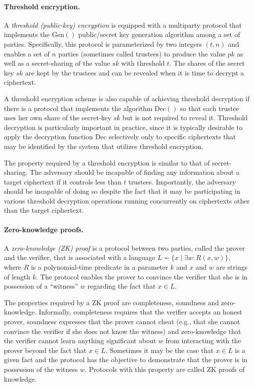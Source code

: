 \paragraph{Threshold encryption.} A \emph{threshold (public-key)
  encryption} is equipped with a multiparty protocol that implements
the $\mathrm{Gen}()$ public/secret key generation algorithm among a
set of parties. Specifically, this protocol is parameterized by two
integers $(t,n)$ and enables a set of $n$ parties (sometimes called
trustees) to produce the value $pk$ as well as a secret-sharing of the
value $sk$ with threshold $t$. The shares of the secret key $sk$ are
kept by the trustees and can be revealed when it is time to decrypt a
ciphertext.

A threshold encryption scheme is also capable of achieving threshold
decryption if there is a protocol that implements the algorithm
$\mathrm{Dec}()$ so that each trustee uses her own share of the
secret-key $sk$ but is not required to reveal it. Threshold decryption
is particularly important in practice, since it is typically desirable
to apply the decryption function $\mathrm{Dec}$ selectively only to
specific ciphertexts that may be identified by the system that
utilizes threshold encryption.

The property required by a threshold encryption is similar to that of
secret-sharing. The adversary should be incapable of finding any
information about a target ciphertext if it controls less than $t$
trustees. Importantly, the adversary should be incapable of doing so
despite the fact that it may be participating in various threshold
decryption operations running concurrently on ciphertexts other than
the target ciphertext.

\paragraph{Zero-knowledge proofs.} A \emph{zero-knowledge (ZK) proof}
is a protocol between two parties, called the prover and the verifier,
that is associated with a language
$L = \{x \mid \exists w : R(x,w)\}$, where $R$ is a polynomial-time
predicate in a parameter $k$ and $x$ and $w$ are strings of length
$k$. The protocol enables the prover to convince the verifier that she
is in possession of a ``witness'' $w$ regarding the fact that
$x\in L$.

The properties required by a ZK proof are completeness, soundness and
zero-knowledge. Informally, completeness requires that the verifier
accepts an honest prover, soundness expresses that the prover cannot
cheat (e.g., that she cannot convince the verifier if she does not
know the witness) and zero-knowledge that the verifier cannot learn
anything significant about $w$ from interacting with the prover beyond
the fact that $x\in L$. Sometimes it may be the case that $x\in L$ is
a given fact and the protocol has the objective to demonstrate that
the prover is in possession of the witness $w$. Protocols with this
property are called ZK proofs of knowledge.

